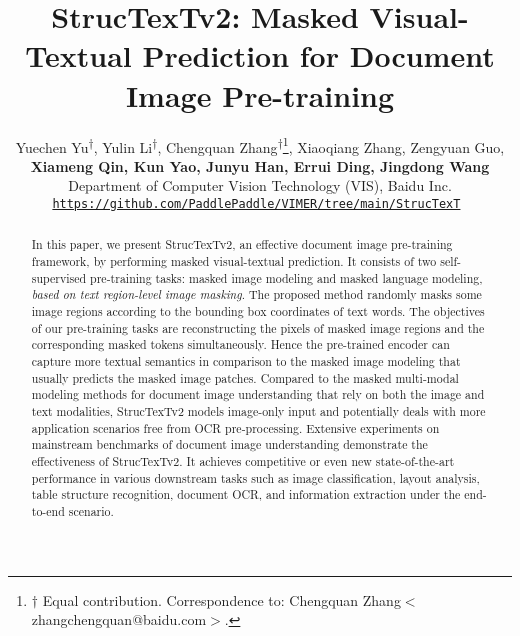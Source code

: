 \documentclass{article} %
\title{StrucTexTv2: Masked Visual-Textual Prediction for Document Image Pre-training}
\author{Yuechen Yu\textsuperscript{\rm $\dag$}, Yulin Li\textsuperscript{\rm $\dag$}, Chengquan Zhang\textsuperscript{\rm $\dag$}\thanks{\rm $\dag$ Equal contribution. Correspondence to: Chengquan Zhang$<$zhangchengquan@baidu.com$>$.}, Xiaoqiang Zhang, Zengyuan Guo, \\
\textbf{Xiameng Qin, Kun Yao, Junyu Han, Errui Ding, Jingdong Wang} \\
Department of Computer Vision Technology (VIS), Baidu Inc.\\
\texttt{\href{https://github.com/PaddlePaddle/VIMER/tree/main/StrucTexT}{https://github.com/PaddlePaddle/VIMER/tree/main/StrucTexT}
}
}
\begin{document}
\maketitle

\begin{abstract}
In this paper, we present StrucTexTv2, an effective document image pre-training framework, by performing masked visual-textual prediction. It consists of two self-supervised pre-training tasks: masked image modeling and masked language modeling, \emph{based on text region-level image masking}. The proposed method randomly masks some image regions according to the bounding box coordinates of text words. The objectives of our pre-training tasks are reconstructing the pixels of masked image regions and the corresponding masked tokens simultaneously. Hence the pre-trained encoder can capture more textual semantics in comparison to the masked image modeling that usually predicts the masked image patches. Compared to the masked multi-modal modeling methods for document image understanding that rely on both the image and text modalities, StrucTexTv2 models image-only input and potentially deals with more application scenarios free from OCR pre-processing. Extensive experiments on mainstream benchmarks of document image understanding demonstrate the effectiveness of StrucTexTv2. It achieves competitive or even new state-of-the-art performance in various downstream tasks such as image classification, layout analysis, table structure recognition, document OCR, and information extraction under the end-to-end scenario. 




\end{abstract}
\end{document}
